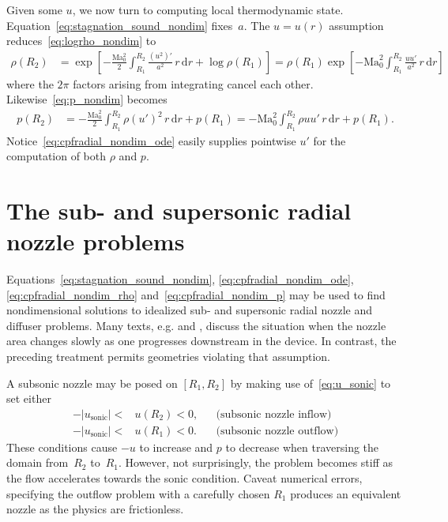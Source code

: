 \documentclass[letterpaper,11pt,nointlimits,reqno]{amsart}
\newcommand{\Mach}[1][]{\mbox{Ma}_{#1}}
\begin{document}
Given some $u$, we now turn to computing local thermodynamic state.
Equation~\eqref{eq:stagnation_sound_nondim} fixes~$a$.  The
$u=u\!\left(r\right)$ assumption reduces~\eqref{eq:logrho_nondim} to
\begin{align}
  \rho\!\left(R_2\right)
  &=
  \exp\left[
    - \frac{\Mach[0]^2}{2} \int_{R_1}^{R_2}
        \frac{\left(u^2\right)'}{a^2}
      \, r \, \mathrm{d}r
    + \log\rho\!\left(R_1\right)
  \right]
   =
  \rho\!\left(R_1\right) \exp\left[
    - \Mach[0]^2 \int_{R_1}^{R_2}
        \frac{u u'}{a^2}
      \, r \, \mathrm{d}r
  \right]
\label{eq:cpfradial_nondim_rho}
\end{align}
where the $2\pi$ factors arising from integrating cancel each other.
Likewise~\eqref{eq:p_nondim} becomes
\begin{align}
  p\!\left(R_2\right)
  &=
    - \frac{\Mach[0]^2}{2} \int_{R_1}^{R_2}
        \rho \left(u'\right)^2
      \, r \, \mathrm{d}r
    + p\!\left(R_1\right)
   =
    -\Mach[0]^2 \int_{R_1}^{R_2} \rho u u' \, r \, \mathrm{d}r
      + p\!\left(R_1\right)
\label{eq:cpfradial_nondim_p}
.
\end{align}
Notice~\eqref{eq:cpfradial_nondim_ode} easily supplies pointwise $u'$ for the
computation of both $\rho$ and $p$.

\section{The sub- and supersonic radial nozzle problems}

Equations~\eqref{eq:stagnation_sound_nondim}, \eqref{eq:cpfradial_nondim_ode},
\eqref{eq:cpfradial_nondim_rho} and~\eqref{eq:cpfradial_nondim_p} may be used
to find nondimensional solutions to idealized sub- and supersonic radial nozzle
and diffuser problems. Many texts, e.g.
\citet[\textsection{}9.4]{White1999Fluid} and
\citet[\textsection{}97]{Landau2004Fluid}, discuss the situation when the
nozzle area changes slowly as one progresses downstream in the device.  In
contrast, the preceding treatment permits geometries violating that assumption.

A subsonic nozzle may be posed on $\left[R_{1}, R_{2}\right]$ by
making use of~\eqref{eq:u_sonic} to set either
\begin{align}
    -\left|u_\text{sonic}\right| < &u\!\left(R_2\right) < 0,
    &
    &\text{(subsonic nozzle inflow)}
\\
    -\left|u_\text{sonic}\right| < &u\!\left(R_1\right) < 0.
    &
    &\text{(subsonic nozzle outflow)}
\end{align}
These conditions cause $-u$ to increase and $p$ to decrease when traversing the
domain from~$R_{2}$ to~$R_{1}$. However, not surprisingly, the problem
becomes stiff as the flow accelerates towards the sonic condition. Caveat
numerical errors, specifying the outflow problem with a carefully chosen $R_1$
produces an equivalent nozzle as the physics are frictionless.
\end{document}
